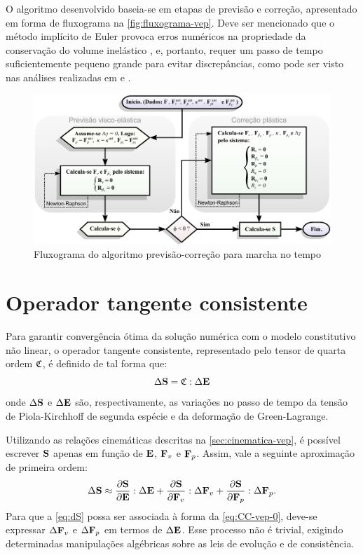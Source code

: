 \documentclass[Tese.tex]{subfiles}
\begin{document}
{ 
O algoritmo desenvolvido baseia-se em etapas de previsão e correção, apresentado em forma de fluxograma na \autoref{fig:fluxograma-vep}. Deve ser mencionado que o método implícito de Euler provoca erros numéricos na propriedade da conservação do volume inelástico \cite{DETTMER200487,Vladimirov}, e, portanto, requer um passo de tempo suficientemente pequeno grande para evitar discrepâncias, como pode ser visto nas análises realizadas em  e .

\begin{figure}[!htb]
	\centering
	\caption{Fluxograma do algoritmo previsão-correção para marcha no tempo}
	\label{fig:fluxograma-vep}
	\includegraphics[scale=0.98]{Figuras/fluxograma-vep.pdf}
\end{figure}

\section{Operador tangente consistente}\label{sec:operador-vep}

Para garantir convergência ótima da solução numérica com o modelo constitutivo não linear, o operador tangente consistente, representado pelo tensor de quarta ordem $\CC$, é definido de tal forma que:
\begin{equation}\label{eq:CC-vep-0}
\Delta\S = \CC:\Delta\E
\end{equation}
onde $\Delta\S$ e $\Delta\E$ são, respectivamente, as variações no passo de tempo da tensão de Piola-Kirchhoff de segunda espécie e da deformação de Green-Lagrange.

Utilizando as relações cinemáticas descritas na \cref{sec:cinematica-vep}, é possível escrever $\S$ apenas em função de $\E$, $\Fv$ e $\Fp$. Assim, vale a seguinte aproximação de primeira ordem:
\begin{equation}\label{eq:dS}
\Delta\S \approx \dfrac{\partial\S}{\partial\E}:\Delta\E + \dfrac{\partial\S}{\partial\Fv}:\Delta\Fv + \dfrac{\partial\S}{\partial\Fp}:\Delta\Fp.
\end{equation}
Para que a \cref{eq:dS} possa ser associada à forma da \cref{eq:CC-vep-0}, deve-se expressar $\Delta\Fv$ e $\Delta\Fp$ em termos de $\Delta\E$. Esse processo não é trivial, exigindo determinadas manipulações algébricas sobre as leis de evolução e de consistência. 

}
\end{document}
